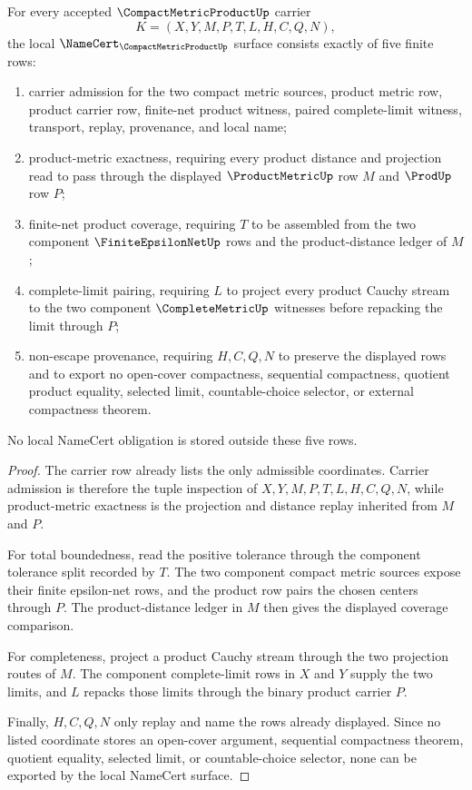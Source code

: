 \begin{theorem}\label{thm:compact-metric-product-namecert-obligations}
For every accepted $\CompactMetricProductUp$ carrier
$$
K=(X,Y,M,P,T,L,H,C,Q,N),
$$
the local $\NameCert_{\CompactMetricProductUp}$ surface consists exactly of five finite rows:
\begin{enumerate}
\item carrier admission for the two compact metric sources, product metric row, product carrier row, finite-net product witness, paired complete-limit witness, transport, replay, provenance, and local name;
\item product-metric exactness, requiring every product distance and projection read to pass through the displayed $\ProductMetricUp$ row $M$ and $\ProdUp$ row $P$;
\item finite-net product coverage, requiring $T$ to be assembled from the two component $\FiniteEpsilonNetUp$ rows and the product-distance ledger of $M$;
\item complete-limit pairing, requiring $L$ to project every product Cauchy stream to the two component $\CompleteMetricUp$ witnesses before repacking the limit through $P$;
\item non-escape provenance, requiring $H,C,Q,N$ to preserve the displayed rows and to export no open-cover compactness, sequential compactness, quotient product equality, selected limit, countable-choice selector, or external compactness theorem.
\end{enumerate}
No local NameCert obligation is stored outside these five rows.
\end{theorem}

\begin{proof}
The carrier row already lists the only admissible coordinates. Carrier admission is therefore the tuple inspection of $X,Y,M,P,T,L,H,C,Q,N$, while product-metric exactness is the projection and distance replay inherited from $M$ and $P$.

For total boundedness, read the positive tolerance through the component tolerance split recorded by $T$. The two component compact metric sources expose their finite epsilon-net rows, and the product row pairs the chosen centers through $P$. The product-distance ledger in $M$ then gives the displayed coverage comparison.

For completeness, project a product Cauchy stream through the two projection routes of $M$. The component complete-limit rows in $X$ and $Y$ supply the two limits, and $L$ repacks those limits through the binary product carrier $P$.

Finally, $H,C,Q,N$ only replay and name the rows already displayed. Since no listed coordinate stores an open-cover argument, sequential compactness theorem, quotient equality, selected limit, or countable-choice selector, none can be exported by the local NameCert surface.
\end{proof}

